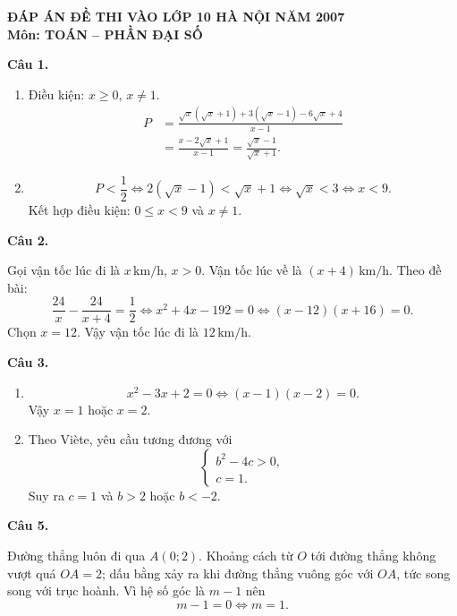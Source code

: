 \documentclass[12pt,a4paper]{article}
\begin{document}
\begin{center}
{\Large\bfseries ĐÁP ÁN ĐỀ THI VÀO LỚP 10 HÀ NỘI NĂM 2007}\\[2pt]
{\bfseries Môn: TOÁN -- PHẦN ĐẠI SỐ}
\end{center}
\textbf{Câu 1.}
\begin{enumerate}[label=\alph*)]
  \item Điều kiện: $x\ge 0$, $x\ne 1$.
  \begin{align*}
  P&=\frac{\sqrt{x}(\sqrt{x}+1)+3(\sqrt{x}-1)-6\sqrt{x}+4}{x-1}\\
   &=\frac{x-2\sqrt{x}+1}{x-1}
    =\frac{\sqrt{x}-1}{\sqrt{x}+1}.
  \end{align*}
  \item
  \[
  P<\frac12
  \iff 2(\sqrt{x}-1)<\sqrt{x}+1
  \iff \sqrt{x}<3
  \iff x<9.
  \]
  Kết hợp điều kiện: $0\le x<9$ và $x\ne 1$.
\end{enumerate}
\textbf{Câu 2.}

Gọi vận tốc lúc đi là $x\,\mathrm{km/h}$, $x>0$. Vận tốc lúc về là $(x+4)\,\mathrm{km/h}$. Theo đề bài:
\[
\frac{24}{x}-\frac{24}{x+4}=\frac12
\iff x^2+4x-192=0
\iff (x-12)(x+16)=0.
\]
Chọn $x=12$. Vậy vận tốc lúc đi là $\boxed{12\,\mathrm{km/h}}$.

\textbf{Câu 3.}
\begin{enumerate}[label=\alph*)]
  \item
  \[
  x^2-3x+2=0\iff(x-1)(x-2)=0.
  \]
  Vậy $x=1$ hoặc $x=2$.
  \item Theo Viète, yêu cầu tương đương với
  \[
  \begin{cases}
  b^2-4c>0,\\
  c=1.
  \end{cases}
  \]
  Suy ra $c=1$ và $b>2$ hoặc $b<-2$.
\end{enumerate}
\textbf{Câu 5.}

Đường thẳng luôn đi qua $A(0;2)$. Khoảng cách từ $O$ tới đường thẳng không vượt quá $OA=2$; dấu bằng xảy ra khi đường thẳng vuông góc với $OA$, tức song song với trục hoành. Vì hệ số góc là $m-1$ nên
\[
m-1=0\iff\boxed{m=1}.
\]
\end{document}
